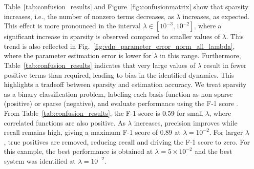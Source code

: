 \documentclass[conference]{ieeeconf}
\begin{document}
    Table~\ref{tab:confusion_results} and Figure~\ref{fig:confusionmatrix} show that sparsity increases, i.e., the number of nonzero terms decreases, as $\lambda$ increases, as expected. This effect is more pronounced in the interval $\lambda \in [10^{-3}, 10^{-2}]$, where a significant increase in sparsity is observed compared to smaller values of $\lambda$. This trend is also reflected in Fig.~\ref{fig:vdp_parameter_error_norm_all_lambda}, where the parameter estimation error is lower for $\lambda$ in this range. Furthermore, Table~\ref{tab:confusion_results} indicates that very large values of $\lambda$ result in fewer positive terms than required, leading to bias in the identified dynamics. This highlights a tradeoff between sparsity and estimation accuracy. We treat sparsity as a binary classification problem, labeling each basis function as non-sparse (positive) or sparse (negative), and evaluate performance using the F-1 score \cite[Chapter~8]{SCC.Manning.Raghavan2009}. From Table~\ref{tab:confusion_results}, the F-1 score is 0.59 for small $\lambda$, where correlated functions are also positive. As $\lambda$ increases, precision improves while recall remains high, giving a maximum F-1 score of 0.89 at $\lambda = 10^{-2}$. For larger $\lambda$, true positives are removed, reducing recall and driving the F-1 score to zero. For this example, the best performance is obtained at $\lambda = 5 \times 10^{-2}$ and the best system was identified at $\lambda = 10^{-2}$.
\end{document}
